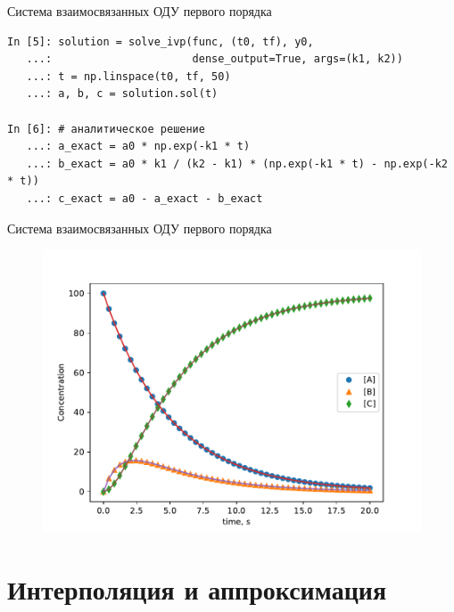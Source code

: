\documentclass[aspectratio=169, mathserif]{beamer}	%
\begin{document}
\begin{frame}[fragile]{Система взаимосвязанных ОДУ первого порядка}
\scriptsize	
\begin{lstlisting}[language=iPython, numbers=none, frame=none]
In [5]: solution = solve_ivp(func, (t0, tf), y0,  
   ...:                      dense_output=True, args=(k1, k2))
   ...: t = np.linspace(t0, tf, 50)
   ...: a, b, c = solution.sol(t)

In [6]: # аналитическое решение
   ...: a_exact = a0 * np.exp(-k1 * t)
   ...: b_exact = a0 * k1 / (k2 - k1) * (np.exp(-k1 * t) - np.exp(-k2 * t))
   ...: c_exact = a0 - a_exact - b_exact
\end{lstlisting}
\vfill
\end{frame}

\begin{frame}[fragile]{Система взаимосвязанных ОДУ первого порядка}
\scriptsize
\begin{figure}[h!]
	\centering
	\includegraphics[width=.7\linewidth]{./pics/Figure_36}
\end{figure}
\vfil
\end{frame}


\section{Интерполяция и аппроксимация}
\sectionframe
\end{document}
